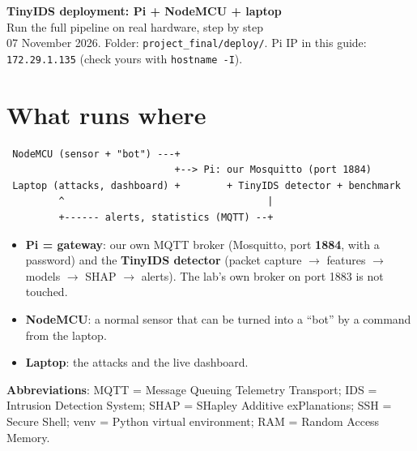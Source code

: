 \documentclass[11pt]{article}
\begin{document}
{\LARGE\bfseries TinyIDS deployment: Pi + NodeMCU + laptop}\\[4pt]
{\large Run the full pipeline on real hardware, step by step}\\[2pt]
07 November 2026. Folder: \texttt{project\_final/deploy/}. Pi IP in this guide: \texttt{172.29.1.135} (check yours with \texttt{hostname -I}).

\tableofcontents

\newpage
\section{What runs where}
\begin{verbatim}
 NodeMCU (sensor + "bot") ---+
                             +--> Pi: our Mosquitto (port 1884)
 Laptop (attacks, dashboard) +        + TinyIDS detector + benchmark
         ^                                   |
         +------ alerts, statistics (MQTT) --+
\end{verbatim}
\begin{itemize}
\item \textbf{Pi = gateway}: our own MQTT broker (Mosquitto, port \textbf{1884}, with a password) and the \textbf{TinyIDS detector}
(packet capture $\rightarrow$ features $\rightarrow$ models $\rightarrow$ SHAP $\rightarrow$ alerts). The lab's own broker on port 1883 is not touched.
\item \textbf{NodeMCU}: a normal sensor that can be turned into a ``bot'' by a command from the laptop.
\item \textbf{Laptop}: the attacks and the live dashboard.
\end{itemize}
\textbf{Abbreviations}: MQTT = Message Queuing Telemetry Transport; IDS = Intrusion Detection System;
SHAP = SHapley Additive exPlanations; SSH = Secure Shell; venv = Python virtual environment; RAM = Random Access Memory.
\end{document}
